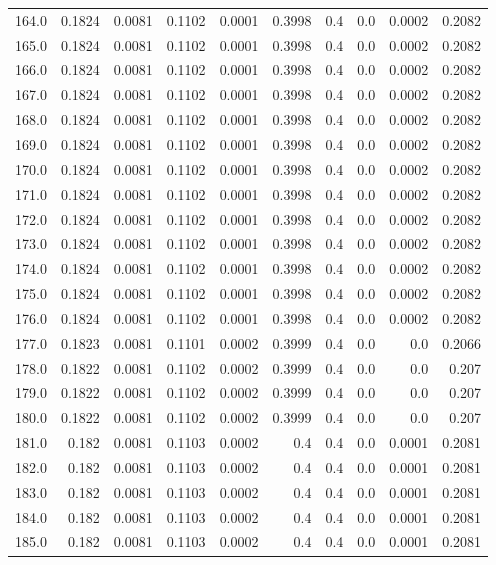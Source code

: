 \begin{longtable}{lrrrrrrrrr}
164.0 & 0.1824 & 0.0081 & 0.1102 & 0.0001 & 0.3998 & 0.4 & 0.0 & 0.0002 & 0.2082 \\
165.0 & 0.1824 & 0.0081 & 0.1102 & 0.0001 & 0.3998 & 0.4 & 0.0 & 0.0002 & 0.2082 \\
166.0 & 0.1824 & 0.0081 & 0.1102 & 0.0001 & 0.3998 & 0.4 & 0.0 & 0.0002 & 0.2082 \\
167.0 & 0.1824 & 0.0081 & 0.1102 & 0.0001 & 0.3998 & 0.4 & 0.0 & 0.0002 & 0.2082 \\
168.0 & 0.1824 & 0.0081 & 0.1102 & 0.0001 & 0.3998 & 0.4 & 0.0 & 0.0002 & 0.2082 \\
169.0 & 0.1824 & 0.0081 & 0.1102 & 0.0001 & 0.3998 & 0.4 & 0.0 & 0.0002 & 0.2082 \\
170.0 & 0.1824 & 0.0081 & 0.1102 & 0.0001 & 0.3998 & 0.4 & 0.0 & 0.0002 & 0.2082 \\
171.0 & 0.1824 & 0.0081 & 0.1102 & 0.0001 & 0.3998 & 0.4 & 0.0 & 0.0002 & 0.2082 \\
172.0 & 0.1824 & 0.0081 & 0.1102 & 0.0001 & 0.3998 & 0.4 & 0.0 & 0.0002 & 0.2082 \\
173.0 & 0.1824 & 0.0081 & 0.1102 & 0.0001 & 0.3998 & 0.4 & 0.0 & 0.0002 & 0.2082 \\
174.0 & 0.1824 & 0.0081 & 0.1102 & 0.0001 & 0.3998 & 0.4 & 0.0 & 0.0002 & 0.2082 \\
175.0 & 0.1824 & 0.0081 & 0.1102 & 0.0001 & 0.3998 & 0.4 & 0.0 & 0.0002 & 0.2082 \\
176.0 & 0.1824 & 0.0081 & 0.1102 & 0.0001 & 0.3998 & 0.4 & 0.0 & 0.0002 & 0.2082 \\
177.0 & 0.1823 & 0.0081 & 0.1101 & 0.0002 & 0.3999 & 0.4 & 0.0 & 0.0 & 0.2066 \\
178.0 & 0.1822 & 0.0081 & 0.1102 & 0.0002 & 0.3999 & 0.4 & 0.0 & 0.0 & 0.207 \\
179.0 & 0.1822 & 0.0081 & 0.1102 & 0.0002 & 0.3999 & 0.4 & 0.0 & 0.0 & 0.207 \\
180.0 & 0.1822 & 0.0081 & 0.1102 & 0.0002 & 0.3999 & 0.4 & 0.0 & 0.0 & 0.207 \\
181.0 & 0.182 & 0.0081 & 0.1103 & 0.0002 & 0.4 & 0.4 & 0.0 & 0.0001 & 0.2081 \\
182.0 & 0.182 & 0.0081 & 0.1103 & 0.0002 & 0.4 & 0.4 & 0.0 & 0.0001 & 0.2081 \\
183.0 & 0.182 & 0.0081 & 0.1103 & 0.0002 & 0.4 & 0.4 & 0.0 & 0.0001 & 0.2081 \\
184.0 & 0.182 & 0.0081 & 0.1103 & 0.0002 & 0.4 & 0.4 & 0.0 & 0.0001 & 0.2081 \\
185.0 & 0.182 & 0.0081 & 0.1103 & 0.0002 & 0.4 & 0.4 & 0.0 & 0.0001 & 0.2081 \\

\end{longtable}
